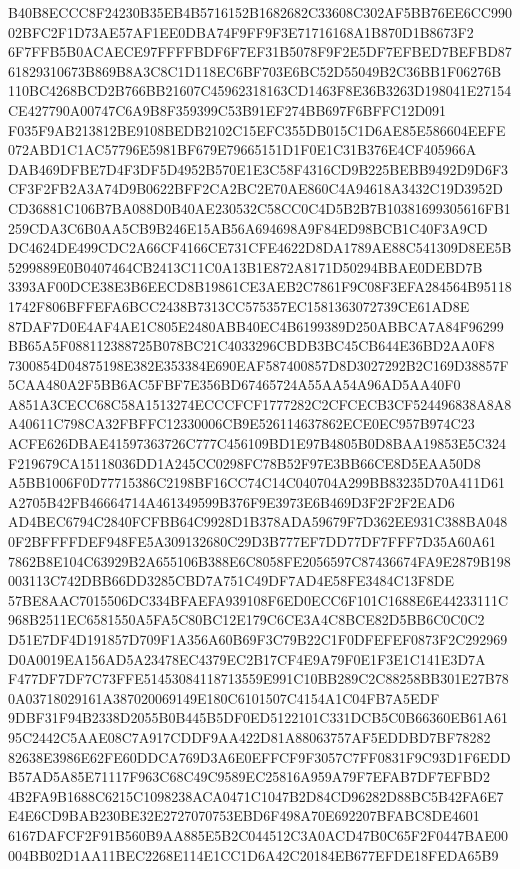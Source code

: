 \documentclass[UTF8,fontset=fandol,zihao=-4,a4paper]{ctexart}
\begin{document}
{{B40B8ECCC8F24230B35EB4B5716152B1682682C33608C302AF5BB76EE6CC99002BFC2F1D73AE57AF1EE0DBA74F9FF9F3E71716168A1B870D1B8673F2
6F7FFB5B0ACAECE97FFFFBDF6F7EF31B5078F9F2E5DF7EFBED7BEFBD8761829310673B869B8A3C8C1D118EC6BF703E6BC52D55049B2C36BB1F06276B
110BC4268BCD2B766BB21607C45962318163CD1463F8E36B3263D198041E27154CE427790A00747C6A9B8F359399C53B91EF274BB697F6BFFC12D091
F035F9AB213812BE9108BEDB2102C15EFC355DB015C1D6AE85E586604EEFE072ABD1C1AC57796E5981BF679E79665151D1F0E1C31B376E4CF405966A
DAB469DFBE7D4F3DF5D4952B570E1E3C58F4316CD9B225BEBB9492D9D6F3CF3F2FB2A3A74D9B0622BFF2CA2BC2E70AE860C4A94618A3432C19D3952D
CD36881C106B7BA088D0B40AE230532C58CC0C4D5B2B7B10381699305616FB1259CDA3C6B0AA5CB9B246E15AB56A694698A9F84ED98BCB1C40F3A9CD
DC4624DE499CDC2A66CF4166CE731CFE4622D8DA1789AE88C541309D8EE5B5299889E0B0407464CB2413C11C0A13B1E872A8171D50294BBAE0DEBD7B
3393AF00DCE38E3B6EECD8B19861CE3AEB2C7861F9C08F3EFA284564B951181742F806BFFEFA6BCC2438B7313CC575357EC1581363072739CE61AD8E
87DAF7D0E4AF4AE1C805E2480ABB40EC4B6199389D250ABBCA7A84F96299BB65A5F088112388725B078BC21C4033296CBDB3BC45CB644E36BD2AA0F8
7300854D04875198E382E353384E690EAF587400857D8D3027292B2C169D38857F5CAA480A2F5BB6AC5FBF7E356BD67465724A55AA54A96AD5AA40F0
A851A3CECC68C58A1513274ECCCFCF1777282C2CFCECB3CF524496838A8A8A40611C798CA32FBFFC12330006CB9E526114637862ECE0EC957B974C23
ACFE626DBAE41597363726C777C456109BD1E97B4805B0D8BAA19853E5C324F219679CA15118036DD1A245CC0298FC78B52F97E3BB66CE8D5EAA50D8
A5BB1006F0D77715386C2198BF16CC74C14C040704A299BB83235D70A411D61A2705B42FB46664714A461349599B376F9E3973E6B469D3F2F2F2EAD6
AD4BEC6794C2840FCFBB64C9928D1B378ADA59679F7D362EE931C388BA0480F2BFFFFDEF948FE5A309132680C29D3B777EF7DD77DF7FFF7D35A60A61
7862B8E104C63929B2A655106B388E6C8058FE2056597C87436674FA9E2879B198003113C742DBB66DD3285CBD7A751C49DF7AD4E58FE3484C13F8DE
57BE8AAC7015506DC334BFAEFA939108F6ED0ECC6F101C1688E6E44233111C968B2511EC6581550A5FA5C80BC12E179C6CE3A4C8BCE82D5BB6C0C0C2
D51E7DF4D191857D709F1A356A60B69F3C79B22C1F0DFEFEF0873F2C292969D0A0019EA156AD5A23478EC4379EC2B17CF4E9A79F0E1F3E1C141E3D7A
F477DF7DF7C73FFE51453084118713559E991C10BB289C2C88258BB301E27B780A03718029161A387020069149E180C6101507C4154A1C04FB7A5EDF
9DBF31F94B2338D2055B0B445B5DF0ED5122101C331DCB5C0B66360EB61A6195C2442C5AAE08C7A917CDDF9AA422D81A88063757AF5EDDBD7BF78282
82638E3986E62FE60DDCA769D3A6E0EFFCF9F3057C7FF0831F9C93D1F6EDDB57AD5A85E71117F963C68C49C9589EC25816A959A79F7EFAB7DF7EFBD2
4B2FA9B1688C6215C1098238ACA0471C1047B2D84CD96282D88BC5B42FA6E7E4E6CD9BAB230BE32E2727070753EBD6F498A70E692207BFABC8DE4601
6167DAFCF2F91B560B9AA885E5B2C044512C3A0ACD47B0C65F2F0447BAE00004BB02D1AA11BEC2268E114E1CC1D6A42C20184EB677EFDE18FEDA65B9
}}
\end{document}
